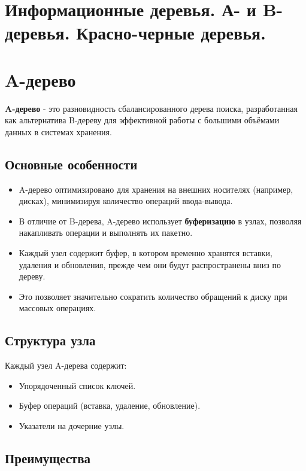 {
	\section{Информационные деревья. А- и B-деревья. Красно-черные деревья.}

	\section*{A-дерево}

\textbf{A-дерево} - это разновидность сбалансированного дерева поиска, разработанная как альтернатива B-дереву для эффективной работы с большими объёмами данных в системах хранения.

\subsection*{Основные особенности}

\begin{itemize}
  \item A-дерево оптимизировано для хранения на внешних носителях (например, дисках), минимизируя количество операций ввода-вывода.
  \item В отличие от B-дерева, A-дерево использует \textbf{буферизацию} в узлах, позволяя накапливать операции и выполнять их пакетно.
  \item Каждый узел содержит буфер, в котором временно хранятся вставки, удаления и обновления, прежде чем они будут распространены вниз по дереву.
  \item Это позволяет значительно сократить количество обращений к диску при массовых операциях.
\end{itemize}

\subsection*{Структура узла}

Каждый узел A-дерева содержит:
\begin{itemize}
  \item Упорядоченный список ключей.
  \item Буфер операций (вставка, удаление, обновление).
  \item Указатели на дочерние узлы.
\end{itemize}

\subsection*{Преимущества}

}
